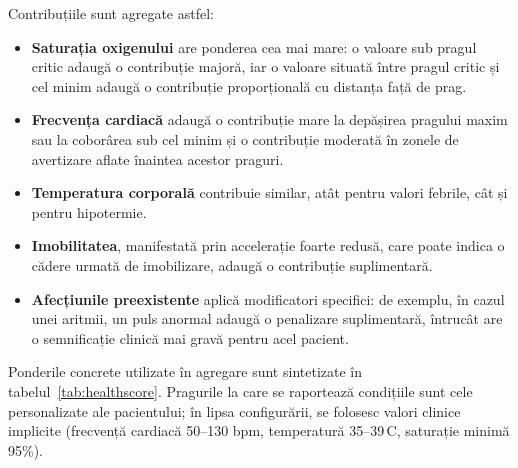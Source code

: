 \documentclass[12pt,a4paper]{article}
\begin{document}
Contribuțiile sunt agregate astfel:

\begin{itemize}[leftmargin=1.5em]
\item \textbf{Saturația oxigenului} are ponderea cea mai mare: o valoare sub pragul critic adaugă o contribuție majoră, iar o valoare situată între pragul critic și cel minim adaugă o contribuție proporțională cu distanța față de prag.
\item \textbf{Frecvența cardiacă} adaugă o contribuție mare la depășirea pragului maxim sau la coborârea sub cel minim și o contribuție moderată în zonele de avertizare aflate înaintea acestor praguri.
\item \textbf{Temperatura corporală} contribuie similar, atât pentru valori febrile, cât și pentru hipotermie.
\item \textbf{Imobilitatea}, manifestată prin accelerație foarte redusă, care poate indica o cădere urmată de imobilizare, adaugă o contribuție suplimentară.
\item \textbf{Afecțiunile preexistente} aplică modificatori specifici: de exemplu, în cazul unei aritmii, un puls anormal adaugă o penalizare suplimentară, întrucât are o semnificație clinică mai gravă pentru acel pacient.
\end{itemize}

Ponderile concrete utilizate în agregare sunt sintetizate în tabelul~\ref{tab:healthscore}. Pragurile la care se raportează condițiile sunt cele personalizate ale pacientului; în lipsa configurării, se folosesc valori clinice implicite (frecvență cardiacă 50--130 bpm, temperatură 35--39\,\textdegree C, saturație minimă 95\%).
\end{document}
